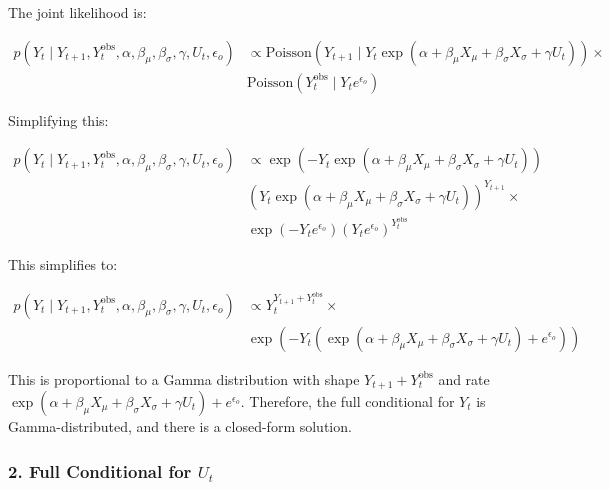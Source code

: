 \documentclass[
  letterpaper,
  DIV=11,
  numbers=noendperiod]{scrartcl}
\begin{document}
The joint likelihood is:

\begin{equation}
\begin{split}
p(Y_t \mid Y_{t+1}, Y_t^{\text{obs}}, \alpha, \beta_{\mu}, \beta_{\sigma}, \gamma, U_t, \epsilon_o) & \propto \text{Poisson}(Y_{t+1} \mid Y_t \exp(\alpha + \beta_{\mu} X_{\mu} + \beta_{\sigma} X_{\sigma} + \gamma U_t)) \times \\ 
& \text{Poisson}(Y_t^{\text{obs}} \mid Y_t e^{\epsilon_o})
\end{split}
\end{equation}

Simplifying this:

\begin{equation}
\begin{split}
p(Y_t \mid Y_{t+1}, Y_t^{\text{obs}}, \alpha, \beta_{\mu}, \beta_{\sigma}, \gamma, U_t, \epsilon_o) & \propto \exp\left(-Y_t \exp(\alpha + \beta_{\mu} X_{\mu} + \beta_{\sigma} X_{\sigma} + \gamma U_t)\right) \\
& \left(Y_t \exp(\alpha + \beta_{\mu} X_{\mu} + \beta_{\sigma} X_{\sigma} + \gamma U_t)\right)^{Y_{t+1}} \times \\ 
& \exp\left(-Y_t e^{\epsilon_o}\right) \left(Y_t e^{\epsilon_o}\right)^{Y_t^{\text{obs}}}
\end{split}
\end{equation}

This simplifies to:

\begin{equation}
\begin{split}
p(Y_t \mid Y_{t+1}, Y_t^{\text{obs}}, \alpha, \beta_{\mu}, \beta_{\sigma}, \gamma, U_t, \epsilon_o)  & \propto Y_t^{Y_{t+1} + Y_t^{\text{obs}}} \times \\
& \exp\left( -Y_t \left( \exp(\alpha + \beta_{\mu} X_{\mu} + \beta_{\sigma} X_{\sigma} + \gamma U_t) + e^{\epsilon_o} \right) \right)
\end{split}
\end{equation}

This is proportional to a Gamma distribution with shape
\(Y_{t+1} + Y_t^{\text{obs}}\) and rate
\(\exp(\alpha + \beta_{\mu} X_{\mu} + \beta_{\sigma} X_{\sigma} + \gamma U_t) + e^{\epsilon_o}\).
Therefore, the full conditional for \(Y_t\) is Gamma-distributed, and
there is a closed-form solution.

\subsubsection{\texorpdfstring{2. Full Conditional for
\(U_t\)}{2. Full Conditional for U\_t}}\label{full-conditional-for-u_t}
\end{document}
